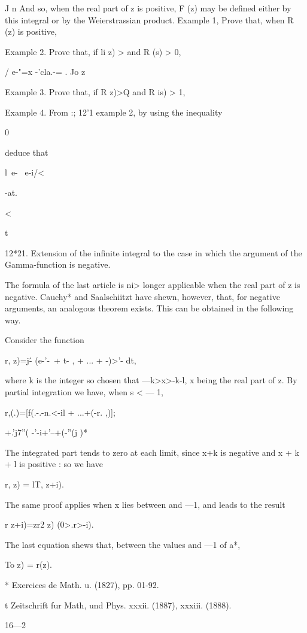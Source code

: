 J n And so, when the real part of z is positive, F (z) may be defined
either by this integral or by the Weierstrassian product. Example 1,
Prove that, when R (z) is positive,

Example 2. Prove that, if li z) > and R (s) > 0,

/ e-"=x -'cla.-= . Jo z

Example 3. Prove that, if R z)>Q and R is) > 1,

Example 4. From :; 12'1 example 2, by using the inequality

0%

deduce that

l\ e- \ e-i/<

-at.



<



t

12*21. Extension of the infinite integral to the case in which the
argument of the Gamma-function is negative.

The formula of the last article is ni> longer applicable when the real
part of z is negative. Cauchy* and Saalschiitzt have shewn, however,
that, for negative arguments, an analogous theorem exists. This can be
obtained in the following way.

Consider the function

r, z)=j\'- (e-'-\ + t- , + ... + -)>'- dt,

where k is the integer so chosen that —k>x>-k-l, x being the real part
of z. By partial integration we have, when s < — 1,

r,(.)=[f(.-.-n.<-il + ...+(-r. ,)];

+.'j7''( -'-i+'--+(-''(j )*

The integrated part tends to zero at each limit, since x+k is negative
and x + k + l is positive : so we have

r, z) = lT, z+i).

The same proof applies when x lies between and —1, and leads to the
result

r z+i)=zr2 z) (0>.r>-i).

The last equation shews that, between the values and —1 of a*,

To z) = r(z).

* Exercices de Math. u. (1827), pp. 01-92.

t Zeitschrift fur Math, und Phys. xxxii. (1887), xxxiii. (1888).

16—2



